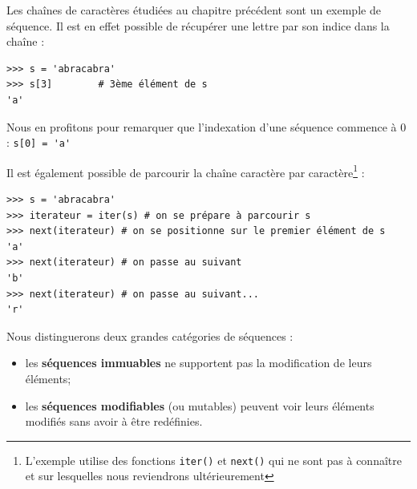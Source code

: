 \documentclass[12pt, a4paper]{article}
\begin{document}
Les chaînes de caractères étudiées au chapitre précédent sont un exemple de séquence. Il est en effet possible de récupérer une lettre par son indice dans la chaîne :
\begin{lstlisting}
>>> s = 'abracabra'
>>> s[3]		# 3ème élément de s
'a'
\end{lstlisting}

Nous en profitons pour remarquer que l'indexation d'une séquence commence à 0 : \lstinline{s[0] = 'a'}

Il est également possible de parcourir la chaîne caractère par caractère\footnote{L'exemple utilise des fonctions \lstinline{iter()} et \lstinline{next()} qui ne sont pas à connaître et sur lesquelles nous reviendrons ultérieurement} :
\begin{lstlisting}
>>> s = 'abracabra'
>>> iterateur = iter(s)	# on se prépare à parcourir s
>>> next(iterateur)	# on se positionne sur le premier élément de s
'a'
>>> next(iterateur)	# on passe au suivant
'b'
>>> next(iterateur)	# on passe au suivant...
'r'
\end{lstlisting}

Nous distinguerons deux grandes catégories de séquences :
\begin{itemize}
	\item les \textbf{séquences immuables} ne supportent pas la modification de leurs éléments;
	\item les \textbf{séquences modifiables} (ou mutables) peuvent voir leurs éléments modifiés sans avoir à être redéfinies.
\end{itemize}
\end{document}
